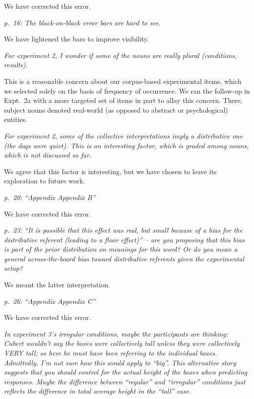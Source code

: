 \documentclass[12pt]{article}
\begin{document}
We have corrected this error.

\item \emph{p.~16: The black-on-black error bars are hard to see.}

We have lightened the bars to improve visibility.

\item \emph{For experiment 2, I wonder if some of the nouns are really plural (\emph{conditions}, \emph{results}).}

This is a reasonable concern about our corpus-based experimental items, which we selected solely on the basis of frequency of occurrence. We ran the follow-up in Expt.~2a with a more targeted set of items in part to allay this concern. There, subject nouns denoted real-world (as opposed to abstract or psychological) entities.

\item \emph{For experiment 2, some of the collective interpretations imply a distributive one (\emph{the dogs were quiet}). This is an interesting factor, which is graded among nouns, which is not discussed so far.}

We agree that this factor is interesting, but we have chosen to leave its exploration to future work.

\item \emph{p.~20: ``Appendix Appendix B''}

We have corrected this error.

\item \emph{p.~23: ``It is possible that this effect was real, but small because of a bias for the distributive referent (leading to a floor effect)'' -- are you proposing that this bias is part of the prior distribution on meanings for this word? Or do you mean a general across-the-board bias toward distributive referents given the experimental setup?}

We meant the latter interpretation.

\item \emph{p.~26: ``Appendix Appendix C''}

We have corrected this error.

\item \emph{In experiment 3's irregular conditions, maybe the participants are thinking: Cubert wouldn't say the boxes were collectively tall unless they were collectively VERY tall; so here he must have been referring to the individual boxes. Admittedly, I'm not sure how this would apply to ``big''. This alternative story suggests that you should control for the actual height of the boxes when predicting responses. Maybe the difference between ``regular'' and ``irregular'' conditions just reflects the difference in total average height in the ``tall'' case.}
\end{document}
